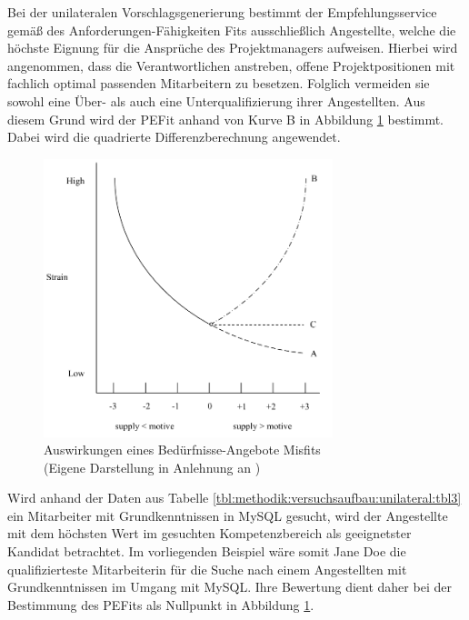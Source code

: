 Bei der unilateralen Vorschlagsgenerierung bestimmt der Empfehlungsservice gemäß des Anforderungen-Fähigkeiten Fits ausschließlich Angestellte, welche die höchste Eignung für die Ansprüche des Projektmanagers aufweisen. Hierbei wird angenommen, dass die Verantwortlichen anstreben, offene Projektpositionen mit fachlich optimal passenden Mitarbeitern zu besetzen. Folglich vermeiden sie sowohl eine Über- als auch eine Unterqualifizierung ihrer Angestellten. Aus diesem Grund wird der \ac{PEFit} anhand von Kurve B in Abbildung \ref{fig:methodik:versuchsaufbau:unilateral:abb2} bestimmt. Dabei wird die quadrierte Differenzberechnung angewendet.

\begin{figure}[h]
	\centering
	\includegraphics[width=0.75\textwidth]{gfx/ueberschuss_supply_motive.png}
	\caption{Auswirkungen eines Bedürfnisse-Angebote Misfits\\(Eigene Darstellung in Anlehnung an \cite[S. 23]{edwards:2008})}
	\label{fig:methodik:versuchsaufbau:unilateral:abb2}
\end{figure}

Wird anhand der Daten aus Tabelle \ref{tbl:methodik:versuchsaufbau:unilateral:tbl3} ein Mitarbeiter mit Grundkenntnissen in MySQL gesucht, wird der Angestellte mit dem höchsten Wert im gesuchten Kompetenzbereich als geeignetster Kandidat betrachtet. Im vorliegenden Beispiel wäre somit Jane Doe die qualifizierteste Mitarbeiterin für die Suche nach einem Angestellten mit Grundkenntnissen im Umgang mit MySQL. Ihre Bewertung dient daher bei der Bestimmung des \acp{PEFit} als Nullpunkt in Abbildung \ref{fig:methodik:versuchsaufbau:unilateral:abb2}.

